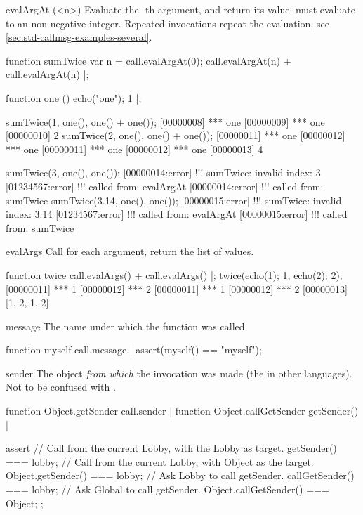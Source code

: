 \begin{urbiscriptapi}
\item[evalArgAt](<n>)%
  Evaluate the -th argument, and return its value.  
  must evaluate to an non-negative integer.  Repeated invocations
  repeat the evaluation, see
  \autoref{sec:std-callmsg-examples-several}.
\begin{urbiscript}
function sumTwice
{
  var n = call.evalArgAt(0);
  call.evalArgAt(n) + call.evalArgAt(n)
}|;

function one () { echo("one"); 1 }|;

sumTwice(1, one(), one() + one());
[00000008] *** one
[00000009] *** one
[00000010] 2
sumTwice(2, one(), one() + one());
[00000011] *** one
[00000012] *** one
[00000011] *** one
[00000012] *** one
[00000013] 4

sumTwice(3, one(), one());
[00000014:error] !!! sumTwice: invalid index: 3
[01234567:error] !!!    called from: evalArgAt
[00000014:error] !!!    called from: sumTwice
sumTwice(3.14, one(), one());
[00000015:error] !!! sumTwice: invalid index: 3.14
[01234567:error] !!!    called from: evalArgAt
[00000015:error] !!!    called from: sumTwice
\end{urbiscript}


\item[evalArgs]%
  Call  for each argument, return the list of values.
\begin{urbiscript}
function twice
{
  call.evalArgs() + call.evalArgs()
}|;
twice({echo(1); 1}, {echo(2); 2});
[00000011] *** 1
[00000012] *** 2
[00000011] *** 1
[00000012] *** 2
[00000013] [1, 2, 1, 2]
\end{urbiscript}


\item[message]
  The name under which the function was called.
\begin{urbiscript}
function myself { call.message }|
assert(myself() == "myself");
\end{urbiscript}


\item[sender]%
  The object \emph{from which} the invocation was made (the  in
  other languages).  Not to be confused with .
\begin{urbiscript}
function Object.getSender { call.sender } |
function Object.callGetSender { getSender() } |

assert
{
  // Call from the current Lobby, with the Lobby as target.
  getSender() === lobby;
  // Call from the current Lobby, with Object as the target.
  Object.getSender() === lobby;
  // Ask Lobby to call getSender.
  callGetSender() === lobby;
  // Ask Global to call getSender.
  Object.callGetSender() === Object;
};
\end{urbiscript}



\end{urbiscriptapi}

